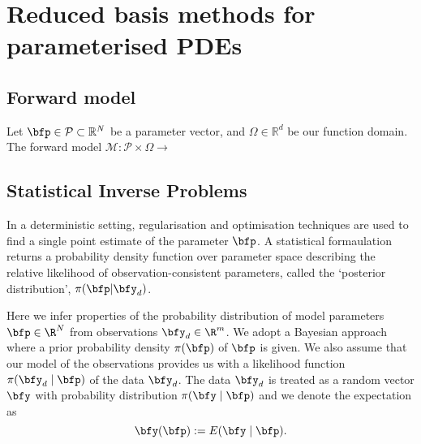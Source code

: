 %
%

\chapter{Reduced basis methods for parameterised PDEs}


\section{Forward model}
Let $\bfp \in \mathcal{P} \subset \mathbb{R}^N$ be a parameter vector, and $\Omega \in \mathbb{R}^d$ be our function domain. The forward model $\mathcal{M}: \mathcal{P}\times \Omega \rightarrow $

\section{Statistical Inverse Problems}
In a deterministic setting, regularisation and optimisation techniques are used to find a single point estimate of the parameter $\bfp$. A statistical formaulation returns a probability density function over parameter space describing the relative likelihood of observation-consistent parameters, called the `posterior distribution', $\pi(\bfp| \bfy_d)$.

Here we infer properties of the probability distribution of model parameters $\bfp\in\R^N$ 
from observations $\bfy_d\in\R^m$. 
We adopt a Bayesian approach where a prior probability density $\pi(\bfp)$ of $\bfp$ is given. 
We also assume that our model of the observations provides us with
a likelihood function $\pi(\bfy_d\mid \bfp)$ of the data $\bfy_d$. 
The data $\bfy_d$ is treated as a random vector $\bfy$ with probability distribution $\pi(\bfy\mid \bfp)$ and we denote the expectation as
\begin{equation*}
\bfy(\bfp) := E(\bfy\mid \bfp).
\end{equation*}

